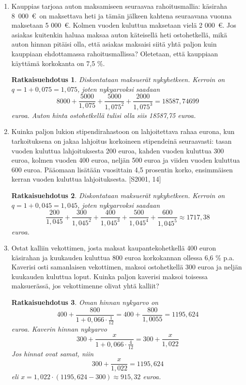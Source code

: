 \documentclass[a4paper,10pt,twoside]{article}
\newtheorem*{ratkaisu}{Ratkaisuehdotus}
\begin{document}
\begin{enumerate}
\item Kauppias tarjoaa auton maksamiseen seuraavaa rahoitusmallia: käsiraha 8~000~\euro \ on maksettava heti ja tämän
jälkeen kahtena seuraavana vuonna maksetaan 5 000~\euro. Kolmen vuoden kuluttua maksetaan vielä 2 000~\euro.
Jos asiakas kuitenkin haluaa maksaa auton käteisellä heti ostohetkellä, mikä auton hinnan pitäisi olla, että asiakas
maksaisi siitä yhtä paljon kuin kauppiaan ehdottamassa rahoitusmallissa? Oletetaan, että kauppiaan käyttämä
korkokanta on 7{,}5 \%.
\begin{ratkaisu}
    Diskontataan maksuerät nykyhetkeen. Kerroin on \(q= 1+0,075 = 1,075\), joten nykyarvoksi saadaan
    \[
        8000 + \frac{5000}{1,075} + \frac{5000}{1,075^2} + \frac{2000}{1,075^3} = 18587,74699
    \]
    euroa. Auton hinta ostohetkellä tulisi olla siis 18587,75 euroa.
\end{ratkaisu}


\item Kuinka paljon lukion stipendirahastoon on lahjoitettava rahaa eurona, kun tarkoituksena on jakaa lahjoitus korkoineen
stipendeinä seuraavasti: tasan vuoden kuluttua lahjoituksesta 200 euroa, kahden vuoden kuluttua 300 euroa,
kolmen vuoden 400 euroa, neljän 500 euroa ja viiden vuoden kuluttua 600 euroa. Pääomaan lisätään vuosittain 4,5 prosentin korko,
ensimmäisen kerran vuoden kuluttua lahjoituksesta. [S2001, 14]
\begin{ratkaisu}
    Diskontataan maksuerät nykyhetkeen. Kerroin on \(q= 1+0,045 = 1,045\), joten nykyarvoksi saadaan
    \[
        \frac{200}{1,045} + \frac{300}{1,045^2} + \frac{400}{1,045^3} + \frac{500}{1,045^4} + \frac{600}{1,045^5} \approx 1717,38
    \]
    euroa.
\end{ratkaisu}

\item Ostat kalliin vekottimen, josta maksat kaupantekohetkellä 400 euron käsirahan ja kuukauden kuluttua 800 euroa korkokannan ollessa 6{,}6 \% p.a.
Kaverisi osti samanlaisen vekottimen, maksoi ostohetkellä 300 euroa ja neljän kuukauden kuluttua loput.
Kuinka paljon kaverisi maksoi toisessa maksuerässä, jos vekottimenne olivat yhtä kalliit?
\begin{ratkaisu}
    Oman hinnan nykyarvo on
    \[
        400 + \frac{800}{1+0,066\cdot\frac{1}{12}} = 400 + \frac{800}{1,0055} = 1195,624
    \]
    euroa. Kaverin hinnan nykyarvo
    \[
        300 + \frac{x}{1+0,066\cdot\frac{4}{12}} = 300 + \frac{x}{1,022}
    \]
    Jos hinnat ovat samat, niin
    \[
        300 + \frac{x}{1,022} =  1195,624
    \]
    eli \( x = 1,022\cdot(1195,624-300)\approx 915,32\) euroa.
\end{ratkaisu}


\end{enumerate}
\end{document}

